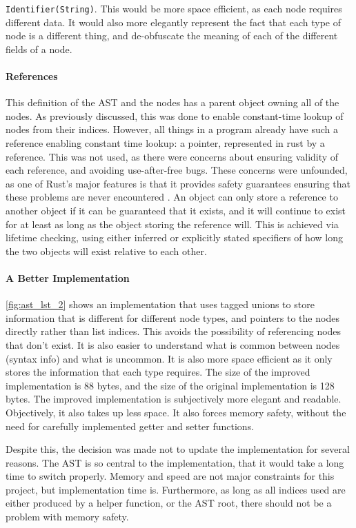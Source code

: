 \noindent\verb|Identifier(String)|. This would be more space efficient, as each node requires different data. It would also more elegantly represent the fact that each type of node is a different thing, and de-obfuscate the meaning of each of the different fields of a node. 

\paragraph{References}
This definition of the AST and the nodes has a parent object owning all of the nodes. As previously discussed, this was done to enable constant-time lookup of nodes from their indices. However, all things in a program already have such a reference enabling constant time lookup: a pointer, represented in rust by a reference. This was not used, as there were concerns about ensuring validity of each reference, and avoiding use-after-free bugs. These concerns were unfounded, as one of Rust's major features is that it provides safety guarantees ensuring that these problems are never encountered \cite{rust_book}. An object can only store a reference to another object if it can be guaranteed that it exists, and it will continue to exist for at least as long as the object storing the reference will. This is achieved via lifetime checking, using either inferred or explicitly stated specifiers of how long the two objects will exist relative to each other. 

\paragraph{A Better Implementation}
\ref{fig:ast_lst_2} shows an implementation that uses tagged unions to store information that is different for different node types, and pointers to the nodes directly rather than list indices. This avoids the possibility of referencing nodes that don't exist. It is also easier to understand what is common between nodes (syntax info) and what is uncommon. It is also more space efficient as it only stores the information that each type requires. The size of the improved implementation is 88 bytes, and the size of the original implementation is 128 bytes. The improved implementation is subjectively more elegant and readable. Objectively, it also takes up less space. It also forces memory safety, without the need for carefully implemented getter and setter functions. 

Despite this, the decision was made not to update the implementation for several reasons. The AST is so central to the implementation, that it would take a long time to switch properly. Memory and speed are not major constraints for this project, but implementation time is. Furthermore, as long as all indices used are either produced by a helper function, or the AST root, there should not be a problem with memory safety. 

